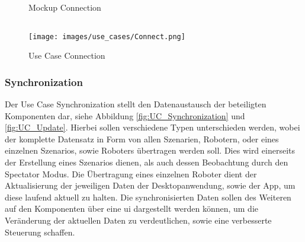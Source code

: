 \begin{figure}[h]
	\centering
	\qquad
	\caption{Mockup Connection}
\end{figure}
\newpage
\begin{verbatim}
\end{verbatim}
\begin{figure}[h]
	\begin{center}
		\texttt{[image: images/use\_cases/Connect.png]}
	\end{center}
	\caption{Use Case Connection}
	\label{fig:UC_Connect}
\end{figure}

\newpage
\subsubsection{Synchronization}

Der Use Case Synchronization stellt den Datenaustausch der beteiligten Komponenten dar, siehe Abbildung \ref{fig:UC_Synchronization} und \ref{fig:UC_Update}. Hierbei sollen verschiedene Typen unterschieden werden, wobei der komplette Datensatz in Form von allen Szenarien, Robotern, oder eines einzelnen Szenarios, sowie Roboters übertragen werden soll. Dies wird einerseits der Erstellung eines Szenarios dienen, als auch dessen Beobachtung durch den Spectator Modus. Die Übertragung eines einzelnen Roboter dient der Aktualisierung der jeweiligen Daten der Desktopanwendung, sowie der App, um diese laufend aktuell zu halten. Die synchronisierten Daten sollen des Weiteren auf den Komponenten über eine \gls{ui} dargestellt werden können, um die Veränderung der aktuellen Daten zu verdeutlichen, sowie eine verbesserte Steuerung schaffen.\\

